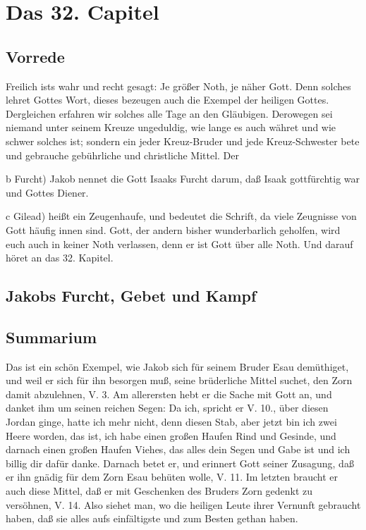 \chapter{Das 32. Capitel}

\section{Vorrede}

Freilich ists wahr und recht gesagt: Je größer Noth, je näher Gott. Denn solches lehret Gottes Wort, dieses bezeugen auch die Exempel der heiligen Gottes. Dergleichen erfahren wir solches alle Tage an den Gläubigen. Derowegen sei niemand unter seinem Kreuze ungeduldig, wie lange es auch währet und wie schwer solches ist; sondern ein jeder Kreuz-Bruder und jede Kreuz-Schwester bete und gebrauche gebührliche und christliche Mittel. Der

b Furcht) Jakob nennet die Gott Isaaks Furcht darum, daß Isaak gottfürchtig war und Gottes Diener.

c Gilead) heißt ein Zeugenhaufe, und bedeutet die Schrift, da viele Zeugnisse von Gott häufig innen sind.
Gott, der andern bisher wunderbarlich geholfen, wird euch auch in keiner Noth verlassen, denn er ist Gott über alle Noth. Und darauf höret an das 32. Kapitel.

\section{Jakobs Furcht, Gebet und Kampf}

\section{Summarium}

Das ist ein schön Exempel, wie Jakob sich für seinem Bruder Esau demüthiget, und weil er sich für ihn besorgen muß, seine brüderliche Mittel suchet, den Zorn damit abzulehnen, V. 3. Am allerersten hebt er die Sache mit Gott an, und danket ihm um seinen reichen Segen: Da ich, spricht er V. 10., über diesen Jordan ginge, hatte ich mehr nicht, denn diesen Stab, aber jetzt bin ich zwei Heere worden, das ist, ich habe einen großen Haufen Rind und Gesinde, und darnach einen großen Haufen Viehes, das alles dein Segen und Gabe ist und ich billig dir dafür danke. Darnach betet er, und erinnert Gott seiner Zusagung, daß er ihn gnädig für dem Zorn Esau behüten wolle, V. 11. Im letzten braucht er auch diese Mittel, daß er mit Geschenken des Bruders Zorn gedenkt zu versöhnen, V. 14. Also siehet man, wo die heiligen Leute ihrer Vernunft gebraucht haben, daß sie alles aufs einfältigste und zum Besten gethan haben.


